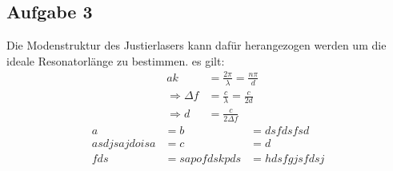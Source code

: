\subsection{Aufgabe 3}
Die Modenstruktur des Justierlasers kann dafür herangezogen werden um die ideale Resonatorlänge zu bestimmen. es gilt:
\begin{align}
&a k &= \frac{2\pi}{\lambda}  = \frac{n\pi}{d} \\
&\Rightarrow \Delta f &= \frac{c}{\lambda} = \frac{c}{2d} \\
&\Rightarrow d &= \frac{c}{2\Delta f}
\end{align}
\begin{align}
a &= b &= dsfdsfsd\\
asdjsajdoisa &= c &= d\\
fds &= sapofdskpds &= hdsfgjsfdsj
\end{align}

